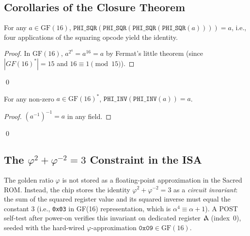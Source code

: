 

\subsection{Corollaries of the Closure Theorem}
\label{subsec:71:corollaries}

\begin{corollary}
\label{cor:71:sqr-involution}
For any $a \in \mathrm{GF}(16)$,
$\mathtt{PHI\_SQR}(\mathtt{PHI\_SQR}(\mathtt{PHI\_SQR}(\mathtt{PHI\_SQR}(a)))) = a$,
i.e., four applications of the squaring opcode yield the identity.
\end{corollary}

\begin{proof}
In $\mathrm{GF}(16)$, $a^{2^4} = a^{16} = a$ by Fermat's little theorem
(since $|GF(16)^*| = 15$ and $16 \equiv 1 \pmod{15}$).
\end{proof}
\qed

\begin{corollary}
\label{cor:71:inv-self}
For any non-zero $a \in \mathrm{GF}(16)^*$,
$\mathtt{PHI\_INV}(\mathtt{PHI\_INV}(a)) = a$.
\end{corollary}

\begin{proof}
$(a^{-1})^{-1} = a$ in any field.
\end{proof}
\qed

\subsection{The $\varphi^2 + \varphi^{-2} = 3$ Constraint in the ISA}
\label{subsec:71:phi-constraint}

The golden ratio $\varphi$ is not stored as a floating-point approximation
in the Sacred ROM.  Instead, the chip stores the identity
$\varphi^2 + \varphi^{-2} = 3$ as a \emph{circuit invariant}: the sum of
the squared register value and its squared inverse must equal the
constant 3 (i.e., \texttt{0x03} in GF(16) representation, which is
$\alpha^4 \equiv \alpha + 1$).  A POST self-test after power-on verifies
this invariant on dedicated register~$\text{Ⲁ}$ (index~0), seeded with
the hard-wired $\varphi$-approximation $\mathtt{0x09} \in \mathrm{GF}(16)$.

